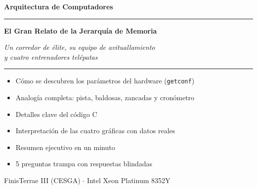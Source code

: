 \documentclass[12pt,a4paper]{article}
\begin{document}
\begin{titlepage}
  \centering\vspace*{1.5cm}
  {\LARGE\bfseries\color{azul} Arquitectura de Computadores\par}
  \vspace{0.3cm}{\large Práctica 1 --- Guía de Defensa Oral\par}
  \vspace{1cm}\rule{0.8\textwidth}{1.2pt}\vspace{0.6cm}

  {\LARGE\bfseries El Gran Relato de la Jerarquía de Memoria\par}
  \vspace{0.4cm}
  {\large\itshape Un corredor de élite, su equipo de avituallamiento\\
   y cuatro entrenadores telépatas\par}
  \vspace{0.6cm}\rule{0.8\textwidth}{1.2pt}\vspace{2.5cm}

  \begin{tcolorbox}[width=0.75\textwidth, colback=azulclaro, colframe=azul,
    title={\bfseries Contenido de este documento}]
    \begin{itemize}[leftmargin=1.2em, itemsep=2pt]
      \item Cómo se descubren los parámetros del hardware (\texttt{getconf})
      \item Analogía completa: pista, baldosas, zancadas y cronómetro
      \item Detalles clave del código C
      \item Interpretación de las cuatro gráficas con datos reales
      \item Resumen ejecutivo en un minuto
      \item 5 preguntas trampa con respuestas blindadas
    \end{itemize}
  \end{tcolorbox}

  \vfill
  {\large FinisTerrae III (CESGA) $\cdot$ Intel Xeon Platinum 8352Y\par}
  \vspace{0.3cm}{\large\today\par}
\end{titlepage}

\tableofcontents\clearpage

\end{document}
